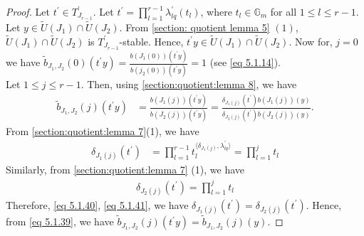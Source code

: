 \documentclass[12pt,reqno]{amsart}
\numberwithin{equation}{section}
\theoremstyle{definition}
\begin{document}
	\begin{proof}
		Let $t^{\prime}\in T^{\prime}_{J_{r-1}}$. Let $t^{\prime}=\prod_{l=1}^{r-1}\lambda^{\prime}_{lq}(t_{l})$, where $t_{l}\in \mathbb{G}_{m}$ for all $1\leq l\leq r-1$. Let $y\in \tilde{U}(J_{1})\cap \tilde{U}(J_{2})$. From \cref{section: quotient lemma 5} $(1)$, $\tilde{U}(J_{1})\cap \tilde{U}(J_{2})$ is $T^{\prime}_{J_{r-1}}$-stable. Hence, $t^{\prime}y\in \tilde{U}(J_{1})\cap \tilde{U}(J_{2})$. Now for, $j=0$ we have $\tilde{b}_{J_{1},J_{2}}(0)(t^{\prime}y)=\frac{b(J_{1}(0))(t^{\prime}y)}{b(j_{2}(0))(t^{\prime}y)}=1$ (see \cref{eq 5.1.14}).\\
		Let $1\leq j\leq r-1$. Then, using \cref{section:quotient:lemma 8}, we have
		\begin{align}
			\tilde{b}_{J_{1},J_{2}}(j)(t^{\prime}y)&=\frac{b(J_{1}(j))(t^{\prime}y)}{b(J_{2}(j))(t^{\prime}y)}
			=\frac{\delta_{J_{1}(j)}(t^{\prime})b(J_{1}(j))(y)}{\delta_{J_{2}(j)}(t^{\prime})b(J_{2}(j))(y)}.\label{eq 5.1.39}
		\end{align}
	From \cref{section:quotient:lemma 7}(1), we have  \begin{align}
		\delta_{J_{1}(j)}(t^{\prime})&=\prod_{l=1}^{r-1}t_{l}^{\langle\delta_{J_{1}(j)},\lambda^{\prime}_{lq}\rangle}
		=\prod_{l=1}^{j}t_{l}\label{eq 5.1.40}
	\end{align}
Similarly, from \cref{section:quotient:lemma 7} (1), we have
\begin{align}
	\delta_{J_{2}(j)}(t^{\prime})=\prod_{l=1}^{j}t_{l}\label{eq 5.1.41}
\end{align}
		Therefore, \cref{eq 5.1.40}, \cref{eq 5.1.41}, we have $\delta_{J_{1}(j)}(t^{\prime})=\delta_{J_{2}(j)}(t^{\prime})$. Hence, 
		from \cref{eq 5.1.39}, we have 	$\tilde{b}_{J_{1},J_{2}}(j)(t^{\prime}y)=\tilde{b}_{J_{1},J_{2}}(j)(y)$.
	\end{proof}
	
\end{document}

